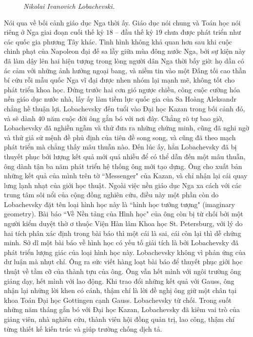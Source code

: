 \begin{multicols}{2}
\begin{figure}[H]
		\caption{\small\textit{\color{lichsutoanhoc}Nikolai Ivanovich Lobachevski.}}
		\vspace*{-10pt}
	\end{figure}
	Nói qua về bối cảnh giáo dục Nga thời ấy. Giáo dục nói chung và Toán học nói riêng ở Nga giai đoạn cuối thế kỷ $18$ -- đầu thế kỷ $19$ chưa được phát triển như các quốc gia phương Tây khác. Tình hình không khả quan hơn sau khi cuộc chinh phạt của Napoleon đại đế sa lầy giữa mùa đông nước Nga, bởi sự kiện này đã làm dậy lên hai hiện tượng trong lòng người dân Nga thời bấy giờ: họ dần có ác cảm với những ảnh hưởng ngoại bang, và niềm tin vào một Đấng tối cao thần bí cứu rỗi mẫu quốc Nga vĩ đại được nhen nhóm lại mạnh mẽ, không tốt cho phát triển khoa học. Đứng trước hai cơn gió ngược chiều, công cuộc cường hóa nền giáo dục nước nhà, lấy ấy làm tiềm lực quốc gia của Sa Hoàng Aleksandr chẳng hề thuận lợi. Lobachevsky đến tuổi vào Đại học Kazan trong bối cảnh đó, và sẽ dành $40$ năm cuộc đời ông gắn bó với nơi đây.
	\vskip 0.01cm
	Chẳng rõ tự bao giờ, Lobachevsky đã nghiền ngẫm và thử đưa ra những chứng minh, cũng đã nghi ngờ và thử giả sử mệnh đề phủ định của tiên đề song song, và cũng đã theo mạch phát triển mà chẳng thấy mâu thuẫn nào. Đến lúc ấy, hẳn Lobachevsky đã bị thuyết phục bởi lượng kết quả mới quá nhiều để có thể dẫn đến một mâu thuẫn, ông dành tận ba năm phát triển hệ thống ông mới tạo dựng. Ông cho xuất bản những kết quả của mình trên tờ ``Messenger" của Kazan, và chỉ nhận lại cái quay lưng lạnh nhạt của giới học thuật. Ngoài việc nền giáo dục Nga xa cách với các trung tâm sôi nổi của cộng đồng nghiên cứu, điều này một phần còn do Lobachevsky đặt tên loại hình học này là ``hình học tưởng tượng" (imaginary geometry). Bài báo ``Về Nền tảng của Hình học" của ông còn bị từ chối bởi một người kiểm duyệt thờ ơ thuộc Viện Hàn lâm Khoa học St. Petersburg, với lý do hai tích phân xác định trong bài báo thì một cái là sai, cái còn lại thì dễ chứng minh. Sở dĩ một bài báo về hình học có yếu tố giải tích là bởi Lobachevsky đã phát triển lượng giác của loại hình học này.
	\vskip 0.1cm
	Lobachevsky không vì phản ứng của dư luận mà nhụt chí. Ông ra sức viết hàng loạt bài báo để thuyết phục giới học thuật về tầm cỡ của thành tựu của ông. Ông vẫn hết mình với ngôi trường ông giảng dạy, hết mình với lao động. Khi trao đổi những kết quả với Gauss, ông nhận lại những lời khen có cánh, thậm chí là lời đề nghị ông giữ một chân tại khoa Toán Đại học Gottingen cạnh Gauss. Lobachevsky từ chối. Trong suốt những năm tháng gắn bó với Đại học Kazan, Lobachevsky đã kiêm vai trò của giảng viên, nhà nghiên cứu, thành viên hội đồng quản trị, lao công, thậm chí từng thiết kế kiến trúc và giúp trường chống dịch tả.

\end{multicols}

